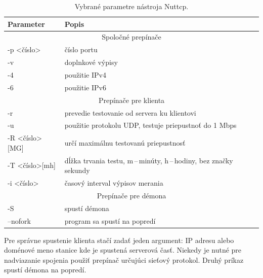         \begin{table}[H]
            \begin{center}
                \begin{tabular}{|l|p{11cm}|}
                    \hline
                     \textbf{Parameter}  &  \textbf{Popis}  \\
                    \hline  
                    \multicolumn{2}{|c|}{Spoločné prepínače} \\
                    \hline
                    -p \textless číslo\textgreater & číslo portu\\
                    -v & doplnkové výpisy\\
                    -4 & použitie IPv4\\
                    -6 & použitie IPv6\\
                    \hline
                    \multicolumn{2}{|c|}{Prepínače pre klienta} \\
                    \hline
                    -r & prevedie testovanie od servera ku klientovi\\
                    -u  & použitie protokolu UDP, testuje 
                        priepustnoť do 1 Mbps \\
                    -R \textless číslo\textgreater[MG]& určí maximálnu 
                        testovanú priepustnosť \\
                    -T  \textless číslo\textgreater[mh]& dĺžka trvania testu,
                        m\,--\,minúty, h\,--\,hodiny, bez značky sekundy\\
                    -i \textless číslo\textgreater & časový interval výpisov
                        merania \\
                    \hline  
                    \multicolumn{2}{|c|}{Prepínače pre démona} \\
                    \hline
                    -S &  spustí démona\\ 
                    --nofork &  program sa spustí na popredí\\
                    \hline
                \end{tabular}
                \caption{Vybrané parametre nástroja Nuttcp.} 
                \label{tab_nuttcp_parametre}
            \end{center}
        \end{table}

        \noindent Pre správne spustenie klienta stačí zadať jeden argument: IP adresu
        alebo doménové meno stanice kde je spustená serverová časť. Niekedy je
        nutné pre nadviazanie spojenia použiť prepínač určujúci sieťový
        protokol. Druhý príkaz spustí démona na popredí.

